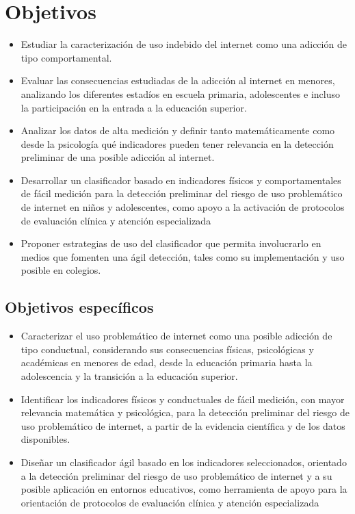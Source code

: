 \documentclass[10pt,letterpaper]{article}
\begin{document}
\section{Objetivos}
\begin{itemize}
\item Estudiar la caracterización de uso indebido del internet como una adicción de tipo comportamental.
\item Evaluar las consecuencias estudiadas de la adicción al internet en menores, analizando los diferentes estadíos en escuela primaria, adolescentes e incluso la participación en la entrada a la educación superior.
\item Analizar los datos de alta medición y definir tanto matemáticamente como desde la psicología qué indicadores pueden tener relevancia en la detección preliminar de una posible adicción al internet.
\item Desarrollar un clasificador basado en indicadores físicos y comportamentales de fácil medición para la detección preliminar del riesgo de uso problemático de internet en niños y adolescentes, como apoyo a la activación de protocolos de evaluación clínica y atención especializada
\item Proponer estrategias de uso del clasificador que permita involucrarlo en medios que fomenten una ágil detección, tales como su implementación y uso posible en colegios.

\end{itemize}
\subsection{Objetivos específicos}
\begin{itemize}
\item Caracterizar el uso problemático de internet como una posible adicción de tipo conductual, considerando sus consecuencias físicas, psicológicas y académicas en menores de edad, desde la educación primaria hasta la adolescencia y la transición a la educación superior. 
\item Identificar los indicadores físicos y conductuales de fácil medición, con mayor relevancia matemática y psicológica, para la detección preliminar del riesgo de uso problemático de internet, a partir de la evidencia científica y de los datos disponibles.
\item Diseñar un clasificador ágil basado en los indicadores seleccionados, orientado a la detección preliminar del riesgo de uso problemático de internet y a su posible aplicación en entornos educativos, como herramienta de apoyo para la orientación de protocolos de evaluación clínica y atención especializada

\end{itemize}
\end{document}
